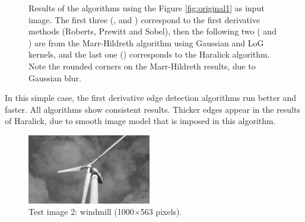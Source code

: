 \documentclass{ipol}
\numberwithin{equation}{section}
\numberwithin{table}{section}
\begin{document}
\begin{figure}[h!]
	\quad
	\quad
	\caption{Results of the algorithms using the Figure \ref{fig:original1} as input image. The first three (,  and ) correspond to the first derivative methods (Roberts, Prewitt and Sobel), then the following two ( and ) are from the Marr-Hildreth algorithm using Gaussian and LoG kernels, and the last one () corresponds to the Haralick algorithm. Note the rounded corners on the Marr-Hildreth results, due to Gaussian blur.}
	\label{fig:result1}
\end{figure}

In this simple case, the first derivative edge detection algorithms run better and faster. All algorithms show consistent results. Thicker edges appear in the results of Haralick, due to smooth image model that is imposed in this algorithm. 

\begin{figure}[t!]
	\centering
	\includegraphics[width=0.48\textwidth]{results/molino_bw.png}
	\caption{Test image 2: windmill (1000$\times$563 pixels).}
	\label{fig:original2}
\end{figure}
\end{document}

